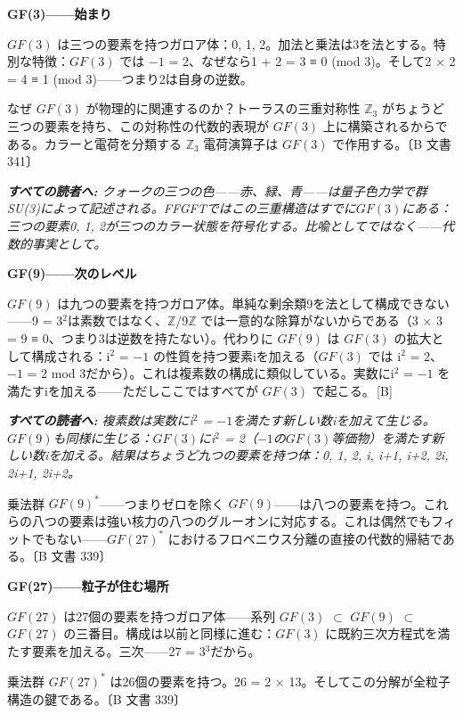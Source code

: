 \documentclass[11pt,openany]{book}
\newcommand{\status}[1]{\penalty10000\,{\tiny\textcolor{gray!70}{[#1]}}}
\newenvironment{laierspur}{%
  \par\vspace{4pt}%
  \noindent\small\itshape\color{blue!60!black}%
  \textbf{すべての読者へ:}\enspace\ignorespaces}{%
  \par\vspace{4pt}\normalsize\normalfont\normalcolor}
\begin{document}
\textbf{GF(3)——始まり}

$GF(3)$ は三つの要素を持つガロア体：{0, 1, 2}。加法と乗法は3を法とする。特別な特徴：$GF(3)$ では $-1$ = 2、なぜなら1 + 2 = 3 ≡ 0 (mod 3)。そして2 $\times$ 2 = 4 ≡ 1 (mod 3)——つまり2は自身の逆数。

なぜ $GF(3)$ が物理的に関連するのか？トーラスの三重対称性 $\mathbb{Z}_3$ がちょうど三つの要素を持ち、この対称性の代数的表現が $GF(3)$ 上に構築されるからである。カラーと電荷を分類する $\mathbb{Z}_3$ 電荷演算子は $GF(3)$ で作用する。〔B 文書 341〕

\begin{laierspur}
クォークの三つの色——赤、緑、青——は量子色力学で群SU(3)によって記述される。FFGFTではこの三重構造はすでに$GF(3)$にある：三つの要素{0, 1, 2}が三つのカラー状態を符号化する。比喩としてではなく——代数的事実として。
\end{laierspur}

\textbf{GF(9)——次のレベル}

$GF(9)$ は九つの要素を持つガロア体。単純な剰余類9を法として構成できない——9 = 3$^2$は素数ではなく、$\mathbb{Z}$/9$\mathbb{Z}$ では一意的な除算がないからである（3 $\times$ 3 = 9 ≡ 0、つまり3は逆数を持たない）。代わりに $GF(9)$ は $GF(3)$ の拡大として構成される：i$^2$ = $-1$ の性質を持つ要素iを加える（$GF(3)$ では i$^2$ = 2、$-1$ = 2 mod 3だから）。これは複素数の構成に類似している。実数にi$^2$ = $-1$ を満たすiを加える——ただしここではすべてが $GF(3)$ で起こる。\status{B}

\begin{laierspur}
複素数は実数にi$^2$ = $-1$を満たす新しい数iを加えて生じる。$GF(9)$も同様に生じる：$GF(3)$にi$^2$ = 2（$-1$の$GF(3)$等価物）を満たす新しい数iを加える。結果はちょうど九つの要素を持つ体：{0, 1, 2, i, i+1, i+2, 2i, 2i+1, 2i+2}。
\end{laierspur}

乗法群 $GF(9)^*$——つまりゼロを除く $GF(9)$——は八つの要素を持つ。これらの八つの要素は強い核力の八つのグルーオンに対応する。これは偶然でもフィットでもない——$GF(27)^*$ におけるフロベニウス分離の直接の代数的帰結である。〔B 文書 339〕

\textbf{GF(27)——粒子が住む場所}

$GF(27)$ は27個の要素を持つガロア体——系列 $GF(3)$ $\subset$ $GF(9)$ $\subset$ $GF(27)$ の三番目。構成は以前と同様に進む：$GF(3)$ に既約三次方程式を満たす要素を加える。三次——27 = 3$^3$だから。

乗法群 $GF(27)^*$ は26個の要素を持つ。26 = 2 $\times$ 13。そしてこの分解が全粒子構造の鍵である。〔B 文書 339〕
\end{document}
